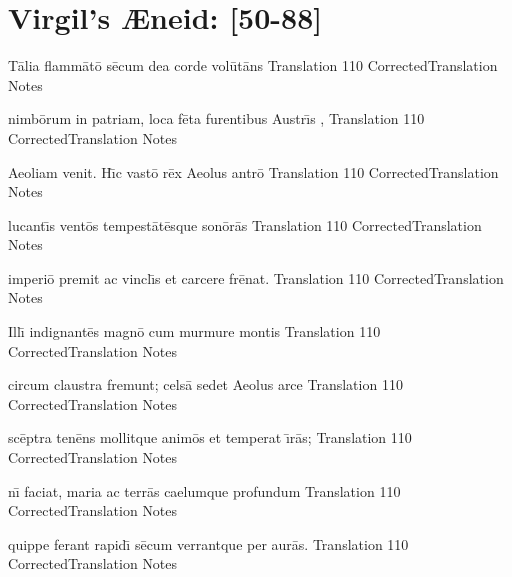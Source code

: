 \documentclass[]{article}
\begin{document}
\section*{Virgil's {\AE}neid:  [50-88]} %



\latline
  {T\={\macron a}lia flamm\={\macron a}t\={\macron o} s\={\macron e}cum dea corde vol\={\macron u}t\={\macron a}ns
}
  { Translation }
  {110}
  { CorrectedTranslation }
  { Notes }


\latline
  {nimb\={\macron o}rum in patriam, loca f\={\macron e}ta furentibus Austr\={\macron \i}s
,}
  { Translation }
  {110}
  { CorrectedTranslation }
  { Notes }


\latline
  {Aeoliam venit.  H\={\macron \i}c vast\={\macron o} r\={\macron e}x Aeolus antr\={\macron o}
}
  { Translation }
  {110}
  { CorrectedTranslation }
  { Notes }


\newpage

\latline
  {lucant\={\macron \i}s vent\={\macron o}s tempest\={\macron a}t\={\macron e}sque son\={\macron o}r\={\macron a}s
}
  { Translation }
  {110}
  { CorrectedTranslation }
  { Notes }


\latline
  {imperi\={\macron o} premit ac vincl\={\macron \i}s et carcere fr\={\macron e}nat.
}
  { Translation }
  {110}
  { CorrectedTranslation }
  { Notes }


\latline
  {Ill\={\macron \i} indignant\={\macron e}s magn\={\macron o} cum murmure montis
}
  { Translation }
  {110}
  { CorrectedTranslation }
  { Notes }


\latline
  {circum claustra fremunt; cels\={\macron a} sedet Aeolus arce
}
  { Translation }
  {110}
  { CorrectedTranslation }
  { Notes }


\latline
  {sc\={\macron e}ptra ten\={\macron e}ns mollitque anim\={\macron o}s et temperat \={\macron \i}r\={\macron a}s;
}
  { Translation }
  {110}
  { CorrectedTranslation }
  { Notes }


\latline
  {n\={\macron \i} faciat, maria ac terr\={\macron a}s caelumque profundum
}
  { Translation }
  {110}
  { CorrectedTranslation }
  { Notes }


\latline
  {quippe ferant rapid\={\macron \i} s\={\macron e}cum verrantque per aur\={\macron a}s.
}
  { Translation }
  {110}
  { CorrectedTranslation }
  { Notes }
\end{document}
